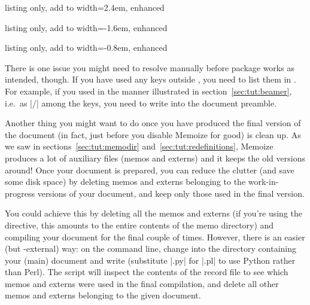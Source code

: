 \documentclass[a4paper,11pt]{article}
\begin{document}
\begin{tcbraster}[raster columns=3, raster force size=false, raster valign=top]
  \begin{tcblisting}{listing only, add to width=2.4em, enhanced}
\usepackage[~disable~]{memoize}
  \end{tcblisting}
  \begin{tcblisting}{listing only, add to width=-1.6em, enhanced}
\usepackage{memoize}
  \end{tcblisting}
  \begin{tcblisting}{listing only, add to width=-0.8em, enhanced}
\usepackage{~no~memoize}
  \end{tcblisting}
\end{tcbraster}

There is one issue you might need to resolve manually before package
 works as intended, though.  If you have used any
 keys outside , you need to list them in
.  For example, if you used  in the manner
illustrated in section~\ref{sec:tut:beamer}, i.e.\ as
|/| among the \TikZ keys, you need to
write  into the document
preamble.

Another thing you might want to do once you have produced the final version of
the document (in fact, just before you disable Memoize for good) is clean up.
As we saw in sections~\ref{sec:tut:memodir} and~\ref{sec:tut:redefinitions},
Memoize produces a lot of auxiliary files (memos and externs) and it keeps the
old versions around!  Once your document is prepared, you can reduce the
clutter (and save some disk space) by deleting memos and externs belonging to
the work-in-progress versions of your document, and keep only those used in the
final version.

You could achieve this by deleting all the memos and externs (if you're using
the  directive, this amounts to the entire contents of the
memo directory) and compiling your document for the final couple of times.
However, there is an easier (but -external) way: on the command
line, change into the directory containing your (main) document and write
 \dmmz (substitute
|.py| for |.pl| to use Python rather than Perl). The script will inspect the
contents of the \dmmz record file to see which memos and externs were used in
the final compilation, and delete all other memos and externs belonging to the
given document.
\end{document}
